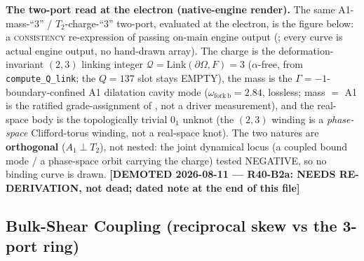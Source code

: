 \medskip\noindent\textbf{The two-port read at the electron (native-engine render).} The same A1-mass-``3'' / $T_2$-charge-``3'' two-port, evaluated at the electron, is the figure below: a \textsc{consistency} re-expression of passing on-main engine output (\texttt{}; every curve is actual engine output, no hand-drawn array). The charge is the deformation-invariant $(2,3)$ linking integer $\mathcal{Q}=\mathrm{Link}(\partial\Omega,F)=3$ ($\alpha$-free, from \texttt{compute\_Q\_link}; the $Q=137$ slot stays EMPTY), the mass is the $\Gamma=-1$\gammaundeclared{}-boundary-confined A1 dilatation cavity mode ($\omega_{\mathrm{fork\,b}}=2.84$, lossless; mass $=$ A1 is the ratified grade-assignment of , not a driver measurement), and the real-space body is the topologically trivial $0_1$ unknot (the $(2,3)$ winding is a \emph{phase-space} Clifford-torus winding, not a real-space knot). The two natures are \textbf{orthogonal} ($A_1\perp T_2$), not nested: the joint dynamical locus (a coupled bound mode / a phase-space orbit carrying the charge) tested NEGATIVE, so no binding curve is drawn. \textbf{[DEMOTED 2026-08-11 --- R40-B2a: NEEDS RE-DERIVATION, not dead; dated note at the end of this file]}



\subsection{Bulk-Shear Coupling (reciprocal skew vs the 3-port ring)}
\label{sec:vol9_node_circulator_ring}

